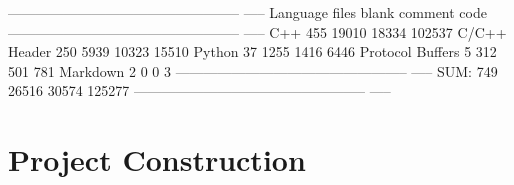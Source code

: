 \begin{content}
\begin{leftbar}
\begin{python}[caption={CompilerCode Stats}]
-------------------------------------------------- -----
Language            files     blank   comment      code
-------------------------------------------------- -----
C++                   455     19010     18334    102537
C/C++ Header          250      5939     10323     15510
Python                 37      1255      1416      6446
Protocol Buffers        5       312       501       781
Markdown 2 0 0 3
-------------------------------------------------- -----
SUM:                  749     26516     30574    125277
-------------------------------------------------- -----
\end{python}
\end{leftbar}

\end{content}


\section{Project Construction}

